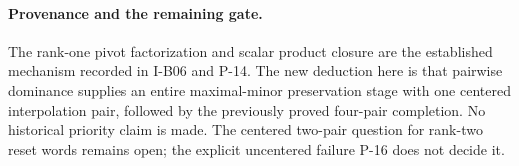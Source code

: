 \paragraph{Provenance and the remaining gate.}
The rank-one pivot factorization and scalar product closure are
the established mechanism recorded in I-B06 and P-14. The new
deduction here is that pairwise dominance supplies an entire
maximal-minor preservation stage with one centered interpolation
pair, followed by the previously proved four-pair completion.
No historical priority claim is made. The centered two-pair
question for rank-two reset words remains open; the explicit
uncentered failure P-16 does not decide it.
